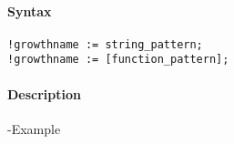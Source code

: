 


	\paragraph{Syntax}\label{syntax}

\begin{verbatim}
!growthname := string_pattern;
!growthname := [function_pattern];
\end{verbatim}

\paragraph{Description}\label{description}

-Example


